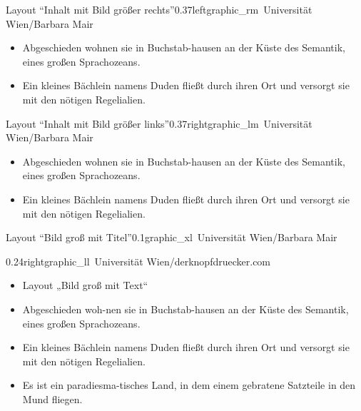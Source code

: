\documentclass[hyperref={pdfpagelabels=false}, aspectratio=43, t]{beamer}  %
\begin{document}
\begin{graphicsFrame}{Layout ``Inhalt mit Bild größer rechts''}{}{0.37}{left}{graphic_rm}{\textcopyright~Universität Wien/Barbara Mair}

		\begin{itemize}
			\item Abgeschieden wohnen sie in Buchstab-hausen an der Küste des Semantik, eines großen Sprachozeans.
			\item Ein kleines Bächlein namens Duden fließt durch ihren Ort und versorgt sie mit den nötigen Regelialien.
		\end{itemize}

\end{graphicsFrame}

\begin{graphicsFrame}{Layout ``Inhalt mit Bild größer links''}{}{0.37}{right}{graphic_lm}{\textcopyright~Universität Wien/Barbara Mair}

		\begin{itemize}
			\item Abgeschieden wohnen sie in Buchstab-hausen an der Küste des Semantik, eines großen Sprachozeans.
			\item Ein kleines Bächlein namens Duden fließt durch ihren Ort und versorgt sie mit den nötigen Regelialien.
		\end{itemize}

\end{graphicsFrame}

\begin{graphicsFrame}{Layout ``Bild groß mit Titel''}{}{0.1}{}{graphic_xl}{\textcopyright~Universität Wien/Barbara Mair}

\end{graphicsFrame}

\begin{graphicsFrame}{}{}{0.24}{right}{graphic_ll}{\textcopyright~Universität Wien/derknopfdruecker.com}

		\begin{itemize}
			\item Layout „Bild groß mit Text“ 
			\item Abgeschieden woh-nen sie in Buchstab-hausen an der Küste des Semantik, eines großen Sprachozeans.
			\item Ein kleines Bächlein namens Duden fließt durch ihren Ort und versorgt sie mit den nötigen Regelialien.
			\item Es ist ein paradiesma-tisches Land, in dem einem gebratene Satzteile in den Mund fliegen.
		\end{itemize}

\end{graphicsFrame}
\end{document}
